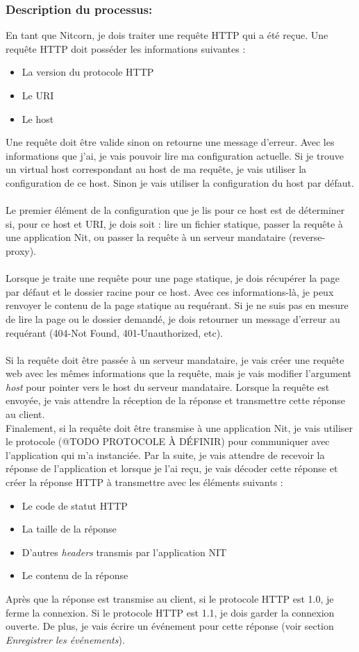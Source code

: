 \documentclass{scrreprt}
\begin{document}
\subsubsection{Description du processus:}En tant que Nitcorn, je dois traiter une requête HTTP qui a été reçue. Une requête HTTP doit posséder les informations suivantes :
\begin{itemize}
    \item La version du protocole HTTP
    \item Le URI
    \item Le host
\end{itemize}
Une requête doit être valide sinon on retourne une message d'erreur. Avec les informations que j'ai, je vais pouvoir lire ma configuration actuelle. Si
je trouve un virtual host correspondant au host de ma requête, je vais utiliser la configuration de ce host. Sinon je vais utiliser la configuration du host par défaut. \\
\\
Le premier élément de la configuration que je lis pour ce host est de déterminer
si, pour ce host et URI, je dois soit : lire un fichier statique, passer la requête
à une application Nit, ou passer la requête à un serveur mandataire (reverse-proxy).\\
\\
Lorsque je traite une requête pour une page statique, je dois récupérer la page par
défaut et le dossier racine pour ce host. Avec ces informations-là, je peux renvoyer
le contenu de la page statique au requérant. Si je ne suis pas en mesure de lire
la page ou le dossier demandé, je dois retourner un message d'erreur au requérant
(404-Not Found, 401-Unauthorized, etc).\\
\\
Si la requête doit être passée à un serveur mandataire, je vais créer
une requête web avec les mêmes informations que la requête, mais je vais modifier
l'argument \textit{host} pour pointer vers le host du serveur mandataire. Lorsque
la requête est envoyée, je vais attendre la réception de la réponse et transmettre
cette réponse au client.
\\
Finalement, si la requête doit être transmise à une application Nit, je vais utiliser
le protocole (@TODO PROTOCOLE À DÉFINIR) pour communiquer avec l'application
qui m'a instanciée. Par la suite, je vais attendre de recevoir la réponse de l'application
et lorsque je l'ai reçu, je vais décoder cette réponse et créer la réponse HTTP
à transmettre avec les éléments suivants :
\begin{itemize}
    \item Le code de statut HTTP
    \item La taille de la réponse
    \item D'autres \textit{headers} transmis par l'application NIT
    \item Le contenu de la réponse
\end{itemize}
Après que la réponse est transmise au client, si le protocole HTTP est 1.0, je ferme
la connexion. Si le protocole HTTP est 1.1, je dois garder la connexion
ouverte. De plus, je vais écrire un événement pour cette réponse (voir section
\textit{Enregistrer les événements}).
\end{document}
